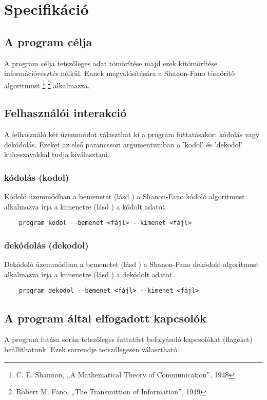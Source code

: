 \chapter{Specifikáció}

\section{A program célja}
A program célja tetszőleges adat tömörítése majd ezek kitömörítése információvesztés nélkül.
Ennek megvalósítására a Shanon-Fano tömörítő algoritmust
\footnote{C. E. Shannon, „A Mathematical Theory of Communication”, 1948}
\footnote{Robert M. Fano, „The Transmittion of Information”, 1949}
alkalmazza.

\section{Felhasználói interakció}
A felhasználó két üzemmódot választhat ki a program futtatásakor: kódolás vagy dekódolás. Ezeket az első parancssori argumentumban a 
'kodol' és 'dekodol' kulcsszavakkal tudja kiválasztani.
\subsection{kódolás (kodol)}
\label{sec:encode}
Kódoló üzemmódban a bemenetet (lásd ) a Shanon-Fano kódoló algoritmust alkalmazva írja a kimenetre (lásd ) a kódolt adatot.
\begin{verbatim}
    program kodol --bemenet <fájl> --kimenet <fájl>
\end{verbatim}
\subsection{dekódolás (dekodol)}
\label{sec:decode}
Dekódoló üzemmódban a bemenetet (lásd ) a Shanon-Fano dekódoló algoritmust alkalmazva írja a kimenetre (lásd ) a dekódolt adatot.
\begin{verbatim}
    program dekodol --bemenet <fájl> --kimenet <fájl>
\end{verbatim}

\newpage
\section{A program által elfogadott kapcsolók}
\label{sec:flags}
A program futása során tetszőleges futtatást befolyásoló kapcsolókat (flageket) beállíthatunk.
Ezek sorrendje tetszőlegesen választható.
